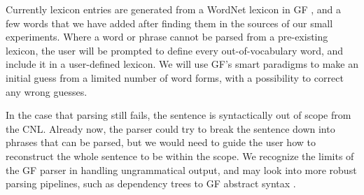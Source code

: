 \documentclass[11pt]{article}
\begin{document}
Currently lexicon entries are generated from a WordNet lexicon in GF \cite{angelov2020parallel}, and a few words that we have added after finding them in the sources of our small experiments. Where a word or phrase cannot be parsed from a pre-existing lexicon, the user will be prompted to define every out-of-vocabulary word, and include it in a user-defined lexicon. We will use GF's smart paradigms \cite{detrez-ranta-2012-smart} to make an initial guess from a limited number of word forms, with a possibility to correct any wrong guesses.

In the case that parsing still fails, the sentence is syntactically out of scope from the CNL. Already now, the parser could try to break the sentence down into phrases that can be parsed, but we would need to guide the user how to reconstruct the whole sentence to be within the scope.
We recognize the limits of the GF parser in handling ungrammatical output, and may look into more robust parsing pipelines, such as dependency trees to GF abstract syntax \cite{kolachina2016abstract}.




\end{document}
